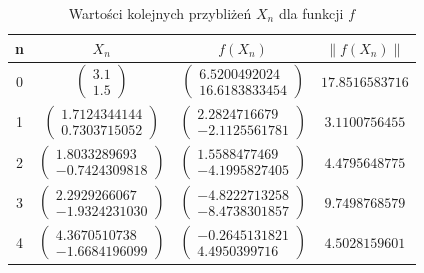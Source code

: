 \documentclass{article}
\begin{document}
    \begin{table}[htb]
      \centering
      \caption{Wartości kolejnych przybliżeń $X_n$ dla funkcji $f$}
      \label{tab:f}
      \begin{tabular}{|c|c|c|c|}
        \hline
        n  & $X_n$                                                         & $f(X_n)$                                                                                  & $\lVert f(X_n)\rVert$          \\ \hline
        0  & $\begin{pmatrix} 3.1          \\ 1.5           \end{pmatrix}$ & $\begin{pmatrix} 6.5200492024                \\ 16.6183833454              \end{pmatrix}$ & $ 17.8516583716 $              \\ \hline
        1  & $\begin{pmatrix} 1.7124344144 \\ 0.7303715052  \end{pmatrix}$ & $\begin{pmatrix} 2.2824716679                \\ -2.1125561781              \end{pmatrix}$ & $ 3.1100756455 $               \\ \hline
        2  & $\begin{pmatrix} 1.8033289693 \\ -0.7424309818 \end{pmatrix}$ & $\begin{pmatrix} 1.5588477469                \\ -4.1995827405              \end{pmatrix}$ & $ 4.4795648775 $               \\ \hline
        3  & $\begin{pmatrix} 2.2929266067 \\ -1.9324231030 \end{pmatrix}$ & $\begin{pmatrix} -4.8222713258               \\ -8.4738301857              \end{pmatrix}$ & $ 9.7498768579 $               \\ \hline
        4  & $\begin{pmatrix} 4.3670510738 \\ -1.6684196099 \end{pmatrix}$ & $\begin{pmatrix} -0.2645131821               \\ 4.4950399716               \end{pmatrix}$ & $ 4.5028159601 $               \\ \hline

\end{tabular}
\end{table}
\end{document}

